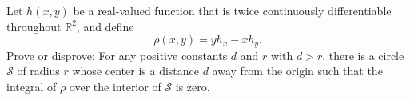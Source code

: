 Let $h(x,y)$ be a real-valued function that is twice continuously differentiable throughout $\mathbb{R}^2$, and define
\[
\rho(x,y) = yh_x - xh_y.
\]
Prove or disprove: For any positive constants $d$ and $r$ with $d>r$, there is a circle $\mathcal{S}$ of radius $r$ whose center is a distance $d$ away from the origin such that the integral of $\rho$ over the interior of $\mathcal{S}$ is zero.

